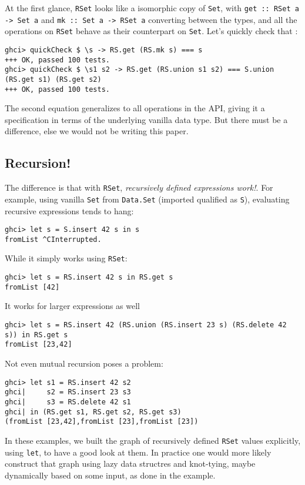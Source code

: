 \documentclass[manuscript,screen,acmsmall]{acmart}
\begin{document}
At the first glance, \verb|RSet| looks like a isomorphic copy of \verb|Set|, with \verb|get :: RSet a -> Set a| and \verb|mk :: Set a -> RSet a| converting between the types, and all the operations on \verb|RSet| behave as their counterpart on \verb|Set|. Let's quickly check that \citep{quickcheck}:
\begin{verbatim}
ghci> quickCheck $ \s -> RS.get (RS.mk s) === s
+++ OK, passed 100 tests.
ghci> quickCheck $ \s1 s2 -> RS.get (RS.union s1 s2) === S.union (RS.get s1) (RS.get s2)
+++ OK, passed 100 tests.
\end{verbatim}

The second equation generalizes to all operations in the API, giving it a specification in terms of the underlying vanilla data type. But there must be a difference, else we would not be writing this paper.

\subsection{Recursion!}

The difference is that with \verb|RSet|, \emph{recursively defined expressions work!}. For example, using vanilla \verb|Set| from \verb|Data.Set| (imported qualified as \verb|S|), evaluating recursive expressions tends to hang:
\begin{verbatim}
ghci> let s = S.insert 42 s in s
fromList ^CInterrupted.
\end{verbatim}
While it simply works using  \verb|RSet|:
\begin{verbatim}
ghci> let s = RS.insert 42 s in RS.get s
fromList [42]
\end{verbatim}
It works for larger expressions as well
\begin{verbatim}
ghci> let s = RS.insert 42 (RS.union (RS.insert 23 s) (RS.delete 42 s)) in RS.get s
fromList [23,42]
\end{verbatim}
Not even mutual recursion poses a problem:
\begin{verbatim}
ghci> let s1 = RS.insert 42 s2
ghci|     s2 = RS.insert 23 s3
ghci|     s3 = RS.delete 42 s1
ghci| in (RS.get s1, RS.get s2, RS.get s3)
(fromList [23,42],fromList [23],fromList [23])
\end{verbatim}

In these examples, we built the graph of recursively defined \verb|RSet| values explicitly, using \verb|let|, to have a good look at them. In practice one would more likely construct that graph using lazy data structres and knot-tying, maybe dynamically based on some input, as done in the example.
\end{document}
